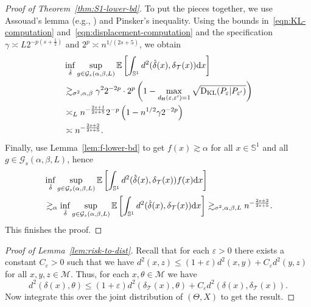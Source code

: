 \documentclass[preprint]{imsart}
\theoremstyle{plain}
\theoremstyle{definition}
\newcommand{\Ebb}{\mathbb{E}}
\newcommand{\Mcal}{\mathcal{M}}
\newcommand{\diff}{\textnormal{d}}
\newcommand{\T}{\mathcal{T}}
\DeclareMathOperator{\KL}{D_{\textnormal{KL}}}
\begin{document}
\begin{appendix}
\begin{proof}[Proof of Theorem~\ref{thm:S1-lower-bd}]
    To put the pieces together, we use Assouad's lemma (e.g., \cite[Theorem~31.2]{Polyanskiy_Wu_BOOK}) and Pinsker's inequality. Using the bounds in~\eqref{eqn:KL-computation} and~\eqref{eqn:displacement-computation} and the specification     $\gamma\asymp L2^{-p(s+\frac{1}{2})}$ and $2^p\asymp n^{1/(2s+5)}$, we obtain
    \begin{align*}
        &\inf_{\hat{\delta}}\sup_{g\in \mathcal{G}_s(\alpha,\beta,L)}\Ebb\left[\int_{\mathbb{S}^1}d^2(\hat{\delta}(x),\delta_{\T}(x))\diff x\right] \\
        &\gtrsim_{\sigma^2,\alpha,\beta} \gamma^22^{-2p}\cdot 2^p\left(1-\max_{d_{\mathrm{H}}(\varepsilon,\varepsilon')=1}\sqrt{\KL(P_{\varepsilon}|P_{\varepsilon'})}\right)\\
        &\asymp_{L} n^{-\frac{2s+1}{2s+5}}2^{-p}\left(1-n^{1/2}\gamma2^{-2p}\right)\\
        &\asymp n^{-\frac{2s+2}{2s+5}}.
    \end{align*}
    Finally, use Lemma~\ref{lem:f-lower-bd} to get $f(x)\gtrsim \alpha$ for all $x\in\mathbb{S}^1$ and all $g\in \mathcal{G}_s(\alpha,\beta,L)$, hence
    \begin{align*}
        &\inf_{\hat{\delta}}\sup_{g\in \mathcal{G}_s(\alpha,\beta,L)}\Ebb\left[\int_{\mathbb{S}^1}d^2(\hat{\delta}(x),\delta_{\T}(x))f(x)\diff x\right] \\
        &\gtrsim_{\alpha}\inf_{\hat{\delta}}\sup_{g\in \mathcal{G}_s(\alpha,\beta,L)}\Ebb\left[\int_{\mathbb{S}^1}d^2(\hat{\delta}(x),\delta_{\T}(x))\diff x\right] \gtrsim_{\sigma^2,\alpha,\beta,L} n^{-\frac{2s+2}{2s+5}}.
    \end{align*}
    This finishes the proof.
\end{proof}

\begin{proof}[Proof of Lemma~\ref{lem:risk-to-dist}]
    Recall \cite[Lemma~2.3]{EvansJaffeSLLN} that for each $\varepsilon>0$ there exists a constant $C_{\varepsilon}>0$ such that we have $d^2(x,z)\le (1+\varepsilon)d^2(x,y) + C_{\varepsilon}d^2(y,z)$ for all $x,y,z\in\Mcal$.
    Thus, for each $x,\theta\in\Mcal$ we have
    \begin{equation*}
        d^2\left(\delta(x),\theta\right)\le (1+\varepsilon)d^2(\delta_{\T}(x),\theta) + C_{\varepsilon}d^2\left(\delta(x),\delta_{\T}(x)\right).
    \end{equation*}
    Now integrate this over the joint distribution of $(\Theta,X)$ to get the result.
\end{proof}



\end{appendix}
\end{document}
